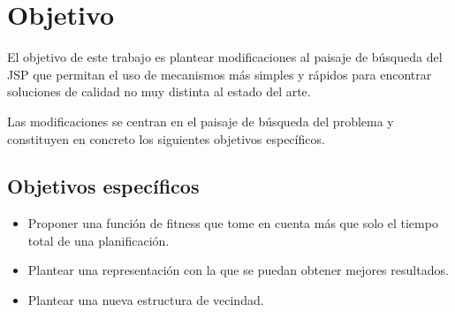\section{Objetivo}

El objetivo de este trabajo es plantear modificaciones al paisaje de búsqueda del JSP que permitan el uso de mecanismos más simples y rápidos para encontrar soluciones de calidad no muy distinta al estado del arte. 

Las modificaciones se centran en el paisaje de búsqueda del problema y constituyen en concreto los siguientes objetivos específicos.


\subsection*{Objetivos específicos}
\begin{itemize}
\item Proponer una función de fitness que tome en cuenta más que solo el tiempo total de una planificación.
\item Plantear una representación con la que se puedan obtener mejores resultados.
\item Plantear una nueva estructura de vecindad.
\end{itemize}

